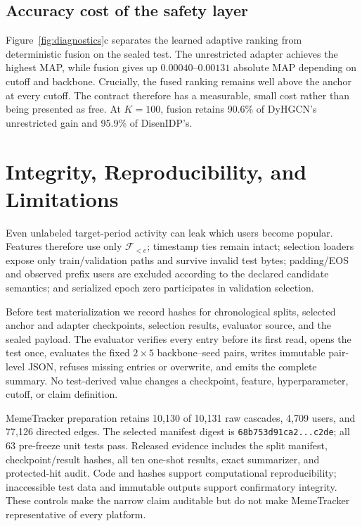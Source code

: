 \documentclass[sigconf,anonymous,review]{acmart}
\begin{document}
\subsection{Accuracy cost of the safety layer}
Figure~\ref{fig:diagnostics}c separates the learned adaptive ranking from deterministic fusion on the sealed test. The unrestricted adapter achieves the highest MAP, while fusion gives up $0.00040$--$0.00131$ absolute MAP depending on cutoff and backbone. Crucially, the fused ranking remains well above the anchor at every cutoff. The contract therefore has a measurable, small cost rather than being presented as free. At $K=100$, fusion retains 90.6\% of DyHGCN's unrestricted gain and 95.9\% of DisenIDP's.

\section{Integrity, Reproducibility, and Limitations}
Even unlabeled target-period activity can leak which users become popular. Features therefore use only $\mathcal F_{<e}$; timestamp ties remain intact; selection loaders expose only train/validation paths and survive invalid test bytes; padding/EOS and observed prefix users are excluded according to the declared candidate semantics; and serialized epoch zero participates in validation selection.

Before test materialization we record hashes for chronological splits, selected anchor and adapter checkpoints, selection results, evaluator source, and the sealed payload. The evaluator verifies every entry before its first read, opens the test once, evaluates the fixed $2\times5$ backbone--seed pairs, writes immutable pair-level JSON, refuses missing entries or overwrite, and emits the complete summary. No test-derived value changes a checkpoint, feature, hyperparameter, cutoff, or claim definition.

MemeTracker preparation retains 10,130 of 10,131 raw cascades, 4,709 users, and 77,126 directed edges. The selected manifest digest is \texttt{68b753d91ca2...c2de}; all 63 pre-freeze unit tests pass. Released evidence includes the split manifest, checkpoint/result hashes, all ten one-shot results, exact summarizer, and protected-hit audit. Code and hashes support computational reproducibility; inaccessible test data and immutable outputs support confirmatory integrity. These controls make the narrow claim auditable but do not make MemeTracker representative of every platform.
\end{document}
